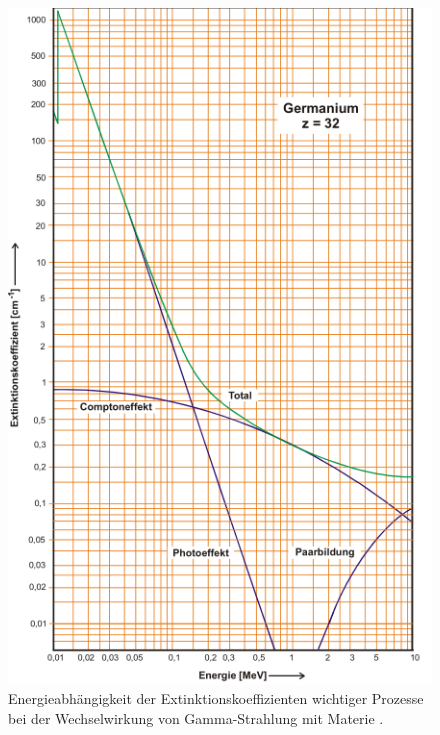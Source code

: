 \begin{figure}
  \includegraphics[width=\textwidth]{content/skizzen/extinktion.png}
  \caption{Energieabhängigkeit der Extinktionskoeffizienten wichtiger Prozesse bei der Wechselwirkung von Gamma-Strahlung mit Materie \cite{sample}.}
  \label{fig:extinktion}
\end{figure}
\FloatBarrier

